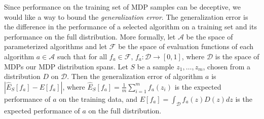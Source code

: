 Since performance on the training set of MDP samples can be deceptive, we would like a way to bound the {\em generalization error}. The generalization error is the difference in the performance of a selected algorithm on a training set and its performance on the full distribution. More formally, let $\mathcal{A}$ be the space of parameterized algorithms and let $\mathcal{F}$ be the space of evaluation functions of each algorithm $a \in \mathcal{A}$ such that for all $f_a \in \mathcal{F}$, $f_a : \mathcal{D} \rightarrow [0,1]$, where $\mathcal{D}$ is the space of MDPs our MDP distribution spans. Let $S$ be a sample $z_1,\dots, z_m$, chosen from a distribution $D$ on $\mathcal{D}$. Then the generalization error of algorithm $a$ is $| \hat{E}_S[f_a] - E[f_a] |$, where $\hat{E}_S[f_a]= \frac{1}{m}\sum_{i=1}^m f_a(z_i)$ is the expected performance of $a$ on the training data, and $E[f_a]= \int_\mathcal{D} f_a(z) D(z) dz$ is the expected performance of $a$ on the full distribution.







{\small

}
